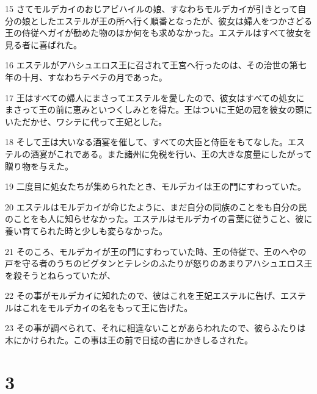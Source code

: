 \par 15 さてモルデカイのおじアビハイルの娘、すなわちモルデカイが引きとって自分の娘としたエステルが王の所へ行く順番となったが、彼女は婦人をつかさどる王の侍従ヘガイが勧めた物のほか何をも求めなかった。エステルはすべて彼女を見る者に喜ばれた。
\par 16 エステルがアハシュエロス王に召されて王宮へ行ったのは、その治世の第七年の十月、すなわちテベテの月であった。
\par 17 王はすべての婦人にまさってエステルを愛したので、彼女はすべての処女にまさって王の前に恵みといつくしみとを得た。王はついに王妃の冠を彼女の頭にいただかせ、ワシテに代って王妃とした。
\par 18 そして王は大いなる酒宴を催して、すべての大臣と侍臣をもてなした。エステルの酒宴がこれである。また諸州に免税を行い、王の大きな度量にしたがって贈り物を与えた。
\par 19 二度目に処女たちが集められたとき、モルデカイは王の門にすわっていた。
\par 20 エステルはモルデカイが命じたように、まだ自分の同族のことをも自分の民のことをも人に知らせなかった。エステルはモルデカイの言葉に従うこと、彼に養い育てられた時と少しも変らなかった。
\par 21 そのころ、モルデカイが王の門にすわっていた時、王の侍従で、王のへやの戸を守る者のうちのビグタンとテレシのふたりが怒りのあまりアハシュエロス王を殺そうとねらっていたが、
\par 22 その事がモルデカイに知れたので、彼はこれを王妃エステルに告げ、エステルはこれをモルデカイの名をもって王に告げた。
\par 23 その事が調べられて、それに相違ないことがあらわれたので、彼らふたりは木にかけられた。この事は王の前で日誌の書にかきしるされた。

\chapter{3}

